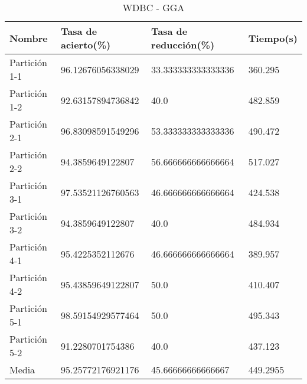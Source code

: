 \begin{table}[H]
	\centering
	\begin{tabular}{l|lll}
		Nombre        & Tasa de acierto(\%) & Tasa de reducción(\%) & Tiempo(s) \\ \hline
		Partición 1-1 & 96.12676056338029   & 33.333333333333336    & 360.295   \\
		Partición 1-2 & 92.63157894736842   & 40.0                  & 482.859   \\
		Partición 2-1 & 96.83098591549296   & 53.333333333333336    & 490.472   \\
		Partición 2-2 & 94.3859649122807    & 56.666666666666664    & 517.027   \\
		Partición 3-1 & 97.53521126760563   & 46.666666666666664    & 424.538   \\
		Partición 3-2 & 94.3859649122807    & 40.0                  & 484.934   \\
		Partición 4-1 & 95.4225352112676    & 46.666666666666664    & 389.957   \\
		Partición 4-2 & 95.43859649122807   & 50.0                  & 410.407   \\
		Partición 5-1 & 98.59154929577464   & 50.0                  & 495.343   \\
		Partición 5-2 & 91.2280701754386    & 40.0                  & 437.123   \\ \hline
		Media         & 95.25772176921176   & 45.66666666666667     & 449.2955 
	\end{tabular}
	\caption{WDBC - GGA}
	\label{WDBC-GGA}
\end{table}